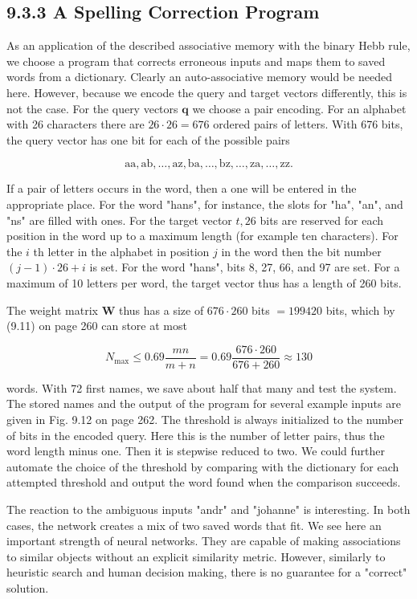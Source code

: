 \documentclass[10pt]{article}
\begin{document}
\subsection*{9.3.3 A Spelling Correction Program}
As an application of the described associative memory with the binary Hebb rule, we choose a program that corrects erroneous inputs and maps them to saved words from a dictionary. Clearly an auto-associative memory would be needed here. However, because we encode the query and target vectors differently, this is not the case. For the query vectors $\boldsymbol{q}$ we choose a pair encoding. For an alphabet with 26 characters there are $26 \cdot 26=676$ ordered pairs of letters. With 676 bits, the query vector has one bit for each of the possible pairs

$$
\mathrm{aa}, \mathrm{ab}, \ldots, \mathrm{az}, \mathrm{ba}, \ldots, \mathrm{bz}, \ldots, \mathrm{za}, \ldots, \mathrm{zz} .
$$

If a pair of letters occurs in the word, then a one will be entered in the appropriate place. For the word "hans", for instance, the slots for "ha", "an", and "ns" are filled with ones. For the target vector $t, 26$ bits are reserved for each position in the word up to a maximum length (for example ten characters). For the $i$ th letter in the alphabet in position $j$ in the word then the bit number $(j-1) \cdot 26+i$ is set. For the word "hans", bits 8, 27, 66, and 97 are set. For a maximum of 10 letters per word, the target vector thus has a length of 260 bits.

The weight matrix $\boldsymbol{W}$ thus has a size of $676 \cdot 260$ bits $=199420$ bits, which by (9.11) on page 260 can store at most

$$
N_{\max } \leq 0.69 \frac{m n}{m+n}=0.69 \frac{676 \cdot 260}{676+260} \approx 130
$$

words. With 72 first names, we save about half that many and test the system. The stored names and the output of the program for several example inputs are given in Fig. 9.12 on page 262. The threshold is always initialized to the number of bits in the encoded query. Here this is the number of letter pairs, thus the word length minus one. Then it is stepwise reduced to two. We could further automate the choice of the threshold by comparing with the dictionary for each attempted threshold and output the word found when the comparison succeeds.

The reaction to the ambiguous inputs "andr" and "johanne" is interesting. In both cases, the network creates a mix of two saved words that fit. We see here an important strength of neural networks. They are capable of making associations to similar objects without an explicit similarity metric. However, similarly to heuristic search and human decision making, there is no guarantee for a "correct" solution.
\end{document}
